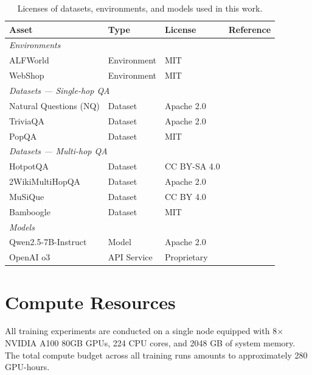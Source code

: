 \begin{table}[htbp]
  \caption{Licenses of datasets, environments, and models used in this work.}
  \label{tab:licenses}
  \centering
  \footnotesize
  \setlength{\tabcolsep}{3pt}
  \begin{tabular}{llll}
  \toprule
  Asset & Type & License & Reference \\
  \midrule
  \multicolumn{4}{l}{\textit{Environments}} \\
  ALFWorld & Environment & MIT & \citet{shridhar2020alfworld} \\
  WebShop & Environment & MIT & \citet{yao2022webshop} \\
  \midrule
  \multicolumn{4}{l}{\textit{Datasets --- Single-hop QA}} \\
  Natural Questions (NQ) & Dataset & Apache 2.0 & \citet{kwiatkowski2019nq} \\
  TriviaQA & Dataset & Apache 2.0 & \citet{joshi2017triviaqa} \\
  PopQA & Dataset & MIT & \citet{mallen2023popqa} \\
  \midrule
  \multicolumn{4}{l}{\textit{Datasets --- Multi-hop QA}} \\
  HotpotQA & Dataset & CC BY-SA 4.0 & \citet{yang2018hotpotqa} \\
  2WikiMultiHopQA & Dataset & Apache 2.0 & \citet{ho2020twowiki} \\
  MuSiQue & Dataset & CC BY 4.0 & \citet{trivedi2022musique} \\
  Bamboogle & Dataset & MIT & \citet{press2023bamboogle} \\
  \midrule
  \multicolumn{4}{l}{\textit{Models}} \\
  Qwen2.5-7B-Instruct & Model & Apache 2.0 & \citet{bai2023qwen} \\
  OpenAI o3 & API Service & Proprietary & \citet{openai2025o3} \\
  \bottomrule
  \end{tabular}
\end{table}

\section{Compute Resources}
\label{app:compute}

All training experiments are conducted on a single node equipped with 8$\times$ NVIDIA A100 80GB GPUs, 224 CPU cores, and 2048 GB of system memory. The total compute budget across all training runs amounts to approximately 280 GPU-hours. 


